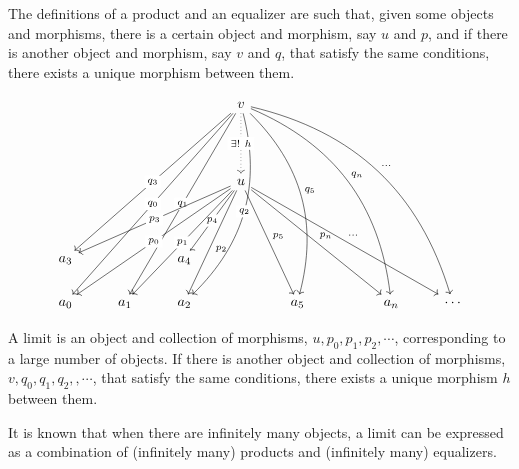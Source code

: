 \documentclass[uplatex,a4j,12pt,dvipdfmx]{jsarticle}
\begin{document}
The definitions of a product and an equalizer are such that, given some objects and morphisms, there is a certain object and morphism, say $u$ and $p$, and if there is another object and morphism, say $v$ and $q$, that satisfy the same conditions, there exists a unique morphism between them.

\[
	\begin{tikzcd}
		& & & v \arrow[lllddddd, "q_{0}" description] \arrow[llldddd, "q_{3}" description] \arrow[llddddd, "q_{1}" description] \arrow[rrrddddd, "q_{n}", bend left] \arrow[rddddd, "q_{5}", bend left] \arrow[lddddd, "q_{2}" description, bend left] \arrow[rrrrddddd, "\cdots", bend left] \arrow[dd, "\exists ! \ h" description, dotted] & && &\\
		& & & & && &\\
		& & & u \arrow[lllddd, "p_{0}" description] \arrow[llldd, "p_{3}" description] \arrow[ldd, "p_{4}" description] \arrow[llddd, "p_{1}" description] \arrow[rddd, "p_{5}"] \arrow[rrrddd, "p_{n}"] \arrow[lddd, "p_{2}"] \arrow[rrrrddd, "\cdots"]& && &\\
		& & & & && &\\
		a_{3} & & a_{4} & & && &\\
		a_{0} & a_{1} & a_{2} & & a_{5} && a_{n} & \cdots
	\end{tikzcd}
\]

A limit is an object and collection of morphisms, $u,p_{0},p_{1},p_{2}, \cdots$, corresponding to a large number of objects. If there is another object and collection of morphisms, $v,q_{0},q_{1},q_{2},, \cdots$, that satisfy the same conditions, there exists a unique morphism $h$ between them.

It is known that when there are infinitely many objects, a limit can be expressed as a combination of (infinitely many) products and (infinitely many) equalizers.
\end{document}
